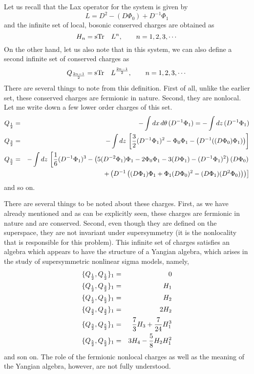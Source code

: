 \documentclass[a4paper,11pt]{article}
\begin{document}
Let us recall that the Lax operator for the system is given by
$$
L = D^{2} - (D\Phi_{0}) + D^{-1} \Phi_{1}
$$
and the infinite set of local, bosonic conserved charges are obtained
as
\begin{equation}
H_{n} = {\rm sTr}\quad L^{n},\qquad n=1,2,3, \cdots
\end{equation}
On the other hand, let us also note that in this system, we can also define
a second infinite set of conserved charges as 
\begin{equation}
Q_{2n-1\over 2} = {\rm sTr}\quad L^{2n-1\over 2},\qquad n = 1,2,3, \cdots
\end{equation}
There are several things to note from this definition. First of all,
unlike the earlier set, these conserved charges are fermionic in
nature. Second, they are nonlocal. Let me write down a few lower order
charges of this set.
\begin{eqnarray}
Q_{1\over 2} & = & - \int dx\,d\theta\, (D^{-1}\Phi_{1}) = - \int
dz\,(D^{-1}\Phi_{1}) \nonumber\\
Q_{3\over 2} & = & - \int dz\,\left[{3\over 2} (D^{-1}\Phi_{1})^{2} -
\Phi_{0}\Phi_{1} -
\left(D^{-1}((D\Phi_{0})\Phi_{1})\right)\right]\nonumber\\
Q_{5\over 2} & = & - \int dz\,\left[{1\over 6} (D^{-1}\Phi_{1})^{3} -
\left(5 (D^{-2}\Phi_{1})\Phi_{1} - 2\Phi_{0}\Phi_{1} - 3 (D\Phi_{1}) -
(D^{-1}\Phi_{1})^{2}\right) (D\Phi_{0})\right.\nonumber\\
 &  & \quad \left. + \left(D^{-1}\left((D\Phi_{1}) \Phi_{1} + \Phi_{1}
(D\Phi_{0})^{2} - (D\Phi_{1})(D^{2}\Phi_{0})\right)\right)\right]
\end{eqnarray}
and so on.

There are several things to be noted about these charges. First, as we
have already mentioned and as can be explicitly seen, these charges
are fermionic in nature and are conserved. Second, even though they
are defined on the superspace, they are not invariant under
supersymmetry (it is the nonlocality that is responsible for this
problem). This infinite set of charges satisfies an algebra which
appears to have the structure of a Yangian algebra, which arises in
the study of supersymmetric nonlinear sigma models, namely,
\begin{eqnarray}
\{Q_{1\over 2},Q_{1\over 2}\}_{1} & = & 0\nonumber\\
\{Q_{1\over 2},Q_{3\over 2}\}_{1} & = & H_{1}\nonumber\\
\{Q_{1\over 2},Q_{5\over 2}\}_{1} & = & H_{2}\nonumber\\
\{Q_{3\over 2},Q_{3\over 2}\}_{1} & = & 2 H_{2}\nonumber\\
\{Q_{3\over 2}, Q_{5\over 2}\}_{1} & = & {7\over 3} H_{3} + {7\over
24} H_{1}^{3}\nonumber\\
\{Q_{5\over 2},Q_{5\over 2}\}_{1} & = & 3 H_{4} - {5\over 8} H_{2}
H_{1}^{2}
\end{eqnarray}
and son on. The role of the fermionic nonlocal charges as well as the
meaning of the Yangian algebra, however, are not fully understood.
\end{document}
